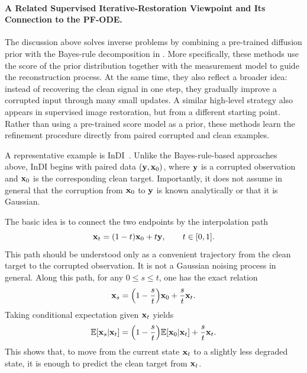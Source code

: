 \paragraph{A Related Supervised Iterative-Restoration Viewpoint and Its Connection to the PF-ODE.}
The discussion above solves inverse problems by combining a pre-trained diffusion prior with the Bayes-rule decomposition in . More specifically, these methods use the score of the prior distribution together with the measurement model to guide the reconstruction process. At the same time, they also reflect a broader idea: instead of recovering the clean signal in one step, they gradually improve a corrupted input through many small updates. A similar high-level strategy also appears in supervised image restoration, but from a different starting point. Rather than using a pre-trained score model as a prior, these methods learn the refinement procedure directly from paired corrupted and clean examples.

A representative example is InDI~\citep{delbracio2023inversion}. Unlike the Bayes-rule-based approaches above, InDI begins with paired data $({\mathbf{y}},{\mathbf{x}}_0)$, where ${\mathbf{y}}$ is a corrupted observation and ${\mathbf{x}}_0$ is the corresponding clean target. Importantly, it does not assume in general that the corruption from ${\mathbf{x}}_0$ to ${\mathbf{y}}$ is known analytically or that it is Gaussian. 

The basic idea is to connect the two endpoints by the interpolation path
\[
{\mathbf{x}}_t=(1-t){\mathbf{x}}_0+t{\mathbf{y}},\qquad t\in[0,1].
\]
This path should be understood only as a convenient trajectory from the clean target to the corrupted observation. It is not a Gaussian noising process in general. Along this path, for any $0\le s\le t$, one has the exact relation
\[
{\mathbf{x}}_s=\Bigl(1-\frac{s}{t}\Bigr){\mathbf{x}}_0+\frac{s}{t}{\mathbf{x}}_t.
\]
Taking conditional expectation given ${\mathbf{x}}_t$ yields
\[
\mathbb E[{\mathbf{x}}_s|{\mathbf{x}}_t]
=
\Bigl(1-\frac{s}{t}\Bigr)\mathbb E[{\mathbf{x}}_0|{\mathbf{x}}_t]
+
\frac{s}{t}{\mathbf{x}}_t.
\]
This shows that, to move from the current state ${\mathbf{x}}_t$ to a slightly less degraded state, it is enough to predict the clean target from ${\mathbf{x}}_t$.

